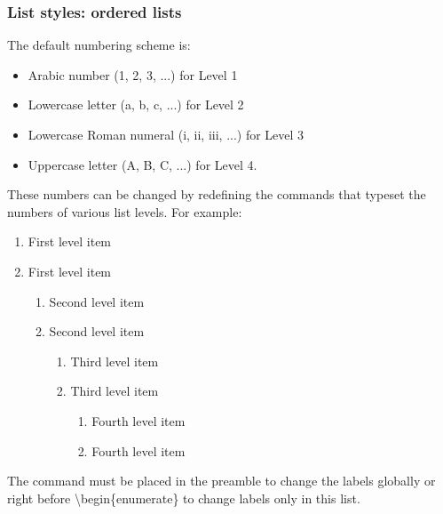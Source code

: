  \subsubsection{List styles: ordered lists} 		%
 The default numbering scheme is: 
 \begin{itemize}
 	\item Arabic number (1, 2, 3, ...) for Level 1 
 	\item Lowercase letter (a, b, c, ...) for Level 2 
 	\item Lowercase Roman numeral (i, ii, iii, ...) for Level 3 
 	\item Uppercase letter (A, B, C, ...) for Level 4. 
 \end{itemize}
 These numbers can be changed by redefining the commands that typeset the numbers of various list levels. For example: 
 \renewcommand{\labelenumii}{\Roman{enumii}}
 \begin{enumerate}
 	\item First level item
 	\item First level item
 	\begin{enumerate}
 		\item Second level item
 		\item Second level item
 		\begin{enumerate}
 			\item Third level item
 			\item Third level item
 			\begin{enumerate}
 				\item Fourth level item
 				\item Fourth level item
 			\end{enumerate}
 		\end{enumerate}
 	\end{enumerate}
 \end{enumerate}
 The command must be placed in the preamble to change the labels globally or right before \textbackslash begin\{enumerate\} to change labels only in this list.
